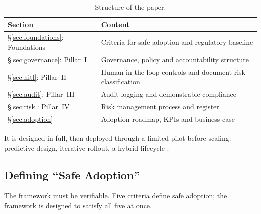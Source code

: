 \documentclass[12pt,a4paper]{article}
\begin{document}
\begin{table}[H]
\centering
\small
{}
\begin{tabular}{@{} p{4.8cm} p{9cm} @{}}
\toprule
\textbf{\color{accentdark}Section} & \textbf{\color{accentdark}Content} \\
\midrule
\S\ref{sec:foundations}: Foundations & Criteria for safe adoption and regulatory baseline \\
\S\ref{sec:governance}: Pillar~I & Governance, policy and accountability structure \\
\S\ref{sec:hitl}: Pillar~II & Human-in-the-loop controls and document risk classification \\
\S\ref{sec:audit}: Pillar~III & Audit logging and demonstrable compliance \\
\S\ref{sec:risk}: Pillar~IV & Risk management process and register \\
\S\ref{sec:adoption} & Adoption roadmap, KPIs and business case \\
\bottomrule
\end{tabular}
\caption{Structure of the paper.}
\label{tab:structure}
\end{table}

It is designed in full, then deployed through a limited pilot before scaling: predictive design, iterative rollout, a hybrid lifecycle \cite{falchi_slides}.

\subsection{Defining ``Safe Adoption''}
\label{sec:safe_adoption}

The framework must be verifiable. Five criteria define safe adoption; the framework is designed to satisfy all five at once.
\end{document}
